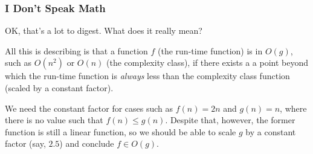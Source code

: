 \documentclass[aspectratio=169, handout]{beamer}
\begin{document}
\begin{frame}[fragile]
  \frametitle{I Don't Speak Math}

  OK, that's a lot to digest. What does it really mean?

  \pause
  \vspace{\fill}

  All this is describing is that a function
  $f$ (the run-time function) is in $O(g)$, such as $O(n^2)$ or $O(n)$ (the 
  complexity class), if there exists a a point beyond which the
  run-time function is \textit{always} less than the complexity class function (scaled by
  a constant factor).

  \pause
  \vspace{\fill}

  We need the constant factor for cases such as $f(n) = 2n$ and $g(n) = n$, where
  there is no value such that $f(n) \leq g(n)$. Despite that, however, the former
  function is still a linear function, so we should be able to scale $g$
  by a constant factor (say, $2.5$) and conclude $f \in O(g)$. 
\end{frame}


\end{document}
